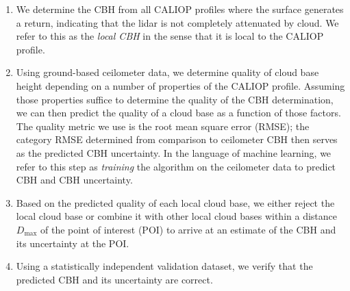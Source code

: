 \documentclass[final,t,12pt]{beamer}\usepackage[]{graphicx}\usepackage[]{color}
\newenvironment{knitrout}{}{} %
\begin{document}
\begin{frame}[fragile]{}
\begin{tcolorbox}
\begin{tcbitemize}[raster equal height=rows, raster columns = 11
      ]
\begin{tcbitemize}[raster columns=1]
        \tcbitem[title={CBASE algorithm}]
        \begin{enumerate}
        \item We determine the CBH from all CALIOP profiles where the
          surface generates a return, indicating that the lidar is not completely
          attenuated by cloud.  We refer to this as the \textit{local
            CBH} in the sense that it is local to the CALIOP profile.
        \item Using ground-based ceilometer data, we determine quality of cloud base
          height depending on a number of properties of the CALIOP profile.  Assuming
          those properties suffice to determine the quality of the CBH determination, we
          can then predict the quality of a cloud base as a function of those factors.
          The quality metric we use is the root mean square error (RMSE); the category
          RMSE determined from comparison to ceilometer CBH then serves as the predicted
          CBH uncertainty.  In the language of machine learning, we refer to this step
          as \textit{training} the algorithm on the ceilometer data to predict CBH and
          CBH uncertainty.
        \item Based on the predicted quality of each local cloud base, we either reject
          the local cloud base or combine it with other local cloud bases within a
          distance $D_\text{max}$ of the point of interest (POI) to arrive at an 
          estimate of the CBH and its uncertainty at the POI.
        \item Using a \alert{statistically independent validation dataset}, we
          verify that the predicted CBH and its uncertainty are correct.
        \end{enumerate}

      \end{tcbitemize}

      \tcbitem[blankest,space to=\myspace, raster multicolumn = 4]
      \begin{tcbitemize}[raster columns=1]
        \tcbitem[add to natural height=\myspace,
        title={``Ground truth''}]
\begin{knitrout}
\color{fgcolor}


\end{knitrout}
\end{tcbitemize}
\end{tcbitemize}
\end{tcolorbox}
\end{frame}
\end{document}
